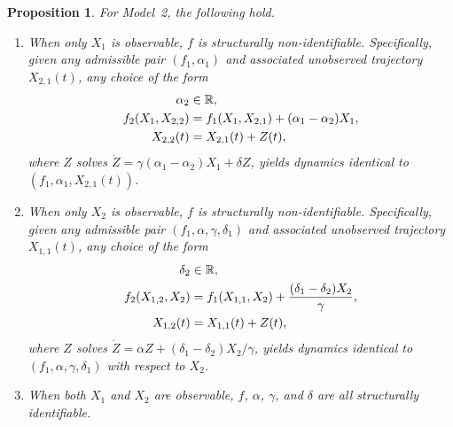 \documentclass{article}
\theoremstyle{plain}
\newtheorem{proposition}{Proposition}[section]
\theoremstyle{definition}
\begin{document}
{\begin{proposition} \label{prop:LV2_observability}\label{prop:LV2_Xobs}\label{prop:LV2_remaining_observability}\label{prop:LV2_Yobs}\label{prop:LV2_both}
For Model~2, the following hold.
\begin{enumerate}
    \item When only $X_1$ is observable, $f$ is structurally non-identifiable. Specifically, given any admissible pair $(f_1, \alpha_1)$ and associated unobserved trajectory $X_{2,1}(t)$, any choice of the form
\begin{align}
    \label{eq:LV2_nonident_expr}
    \alpha_2&\in\mathbb{R}, \notag \\
    f_2(X_1, X_{2,2}) &= f_1(X_1, X_{2,1}) + (\alpha_1 - \alpha_2)X_1, \notag \\
    X_{2,2}(t)         &= X_{2,1}(t) + Z(t),
\end{align}
    where $Z$ solves $\dot{Z} = \gamma(\alpha_1 - \alpha_2)X_1 + \delta Z$, yields dynamics identical to $(f_1, \alpha_1, X_{2,1}(t))$.
    \item When only $X_2$ is observable, $f$ is structurally non-identifiable. Specifically, given any admissible pair $(f_1, \alpha, \gamma, \delta_1)$ and associated unobserved trajectory $X_{1,1}(t)$, any choice of the form
\begin{align} \label{eq:LV2_Yobs_nonident_expr}
    \delta_2&\in\mathbb{R}, \notag \\
    f_2(X_{1,2}, X_2) &= f_1(X_{1,1}, X_2) + \frac{(\delta_1 - \delta_2)X_2}{\gamma}, \notag \\
    X_{1,2}(t)      &= X_{1,1}(t) + Z(t),
\end{align}
    where $Z$ solves $\dot{Z} = \alpha Z + (\delta_1 - \delta_2)X_2/\gamma$, yields dynamics identical to $(f_1, \alpha, \gamma, \delta_1)$ with respect to $X_2$.
    \item When both $X_1$ and $X_2$ are observable, $f$, $\alpha$, $\gamma$, and $\delta$ are all structurally identifiable.
\end{enumerate}
\end{proposition}

}
\end{document}
